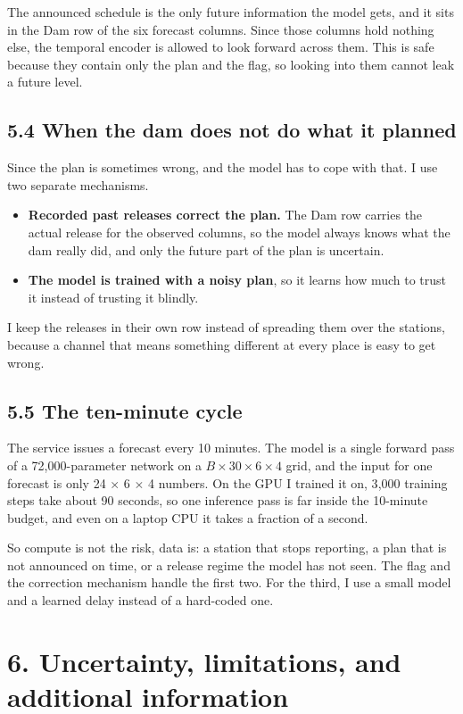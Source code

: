 \documentclass[11pt,letterpaper]{article}
\begin{document}
The announced schedule is the only future information the model gets, and it sits in
the Dam row of the six forecast columns. Since those columns hold nothing else, the
temporal encoder is allowed to look forward across them. This is safe because they
contain only the plan and the flag, so looking into them cannot leak a future level.

\subsection*{5.4 When the dam does not do what it planned}

Since the plan is sometimes wrong, and the model has to cope with that. I use two separate
mechanisms.

\begin{itemize}
\item \textbf{Recorded past releases correct the plan.} The Dam row carries the
actual release for the observed columns, so the model always knows what the dam
really did, and only the future part of the plan is uncertain.
\item \textbf{The model is trained with a noisy plan}, so it learns how much to
trust it instead of trusting it blindly.
\end{itemize}

I keep the releases in their own row instead of spreading them over the stations,
because a channel that means something different at every place is easy to get
wrong.

\subsection*{5.5 The ten-minute cycle}

The service issues a forecast every 10 minutes. The model is a single forward pass
of a 72{,}000-parameter network on a $B\times30\times6\times4$ grid, and the input
for one forecast is only 24 $\times$ 6 $\times$ 4 numbers. On the GPU I trained it
on, 3{,}000 training steps take about 90 seconds, so one inference pass is far
inside the 10-minute budget, and even on a laptop CPU it takes a fraction of a
second.

So compute is not the risk, data is: a station that stops reporting, a plan that is
not announced on time, or a release regime the model has not seen. The flag and the
correction mechanism handle the first two. For the third, I use a small model and a
learned delay instead of a hard-coded one.


\section*{6. Uncertainty, limitations, and additional information}
\end{document}
